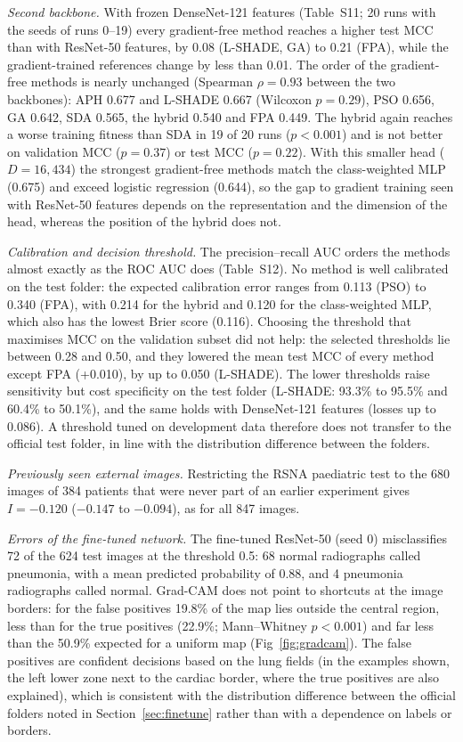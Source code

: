 \documentclass[preprint,12pt]{elsarticle}
\begin{document}
\emph{Second backbone.} With frozen DenseNet-121 features (Table~S11; 20 runs with the seeds of runs 0--19) every gradient-free method reaches a higher test MCC than with ResNet-50 features, by 0.08 (L-SHADE, GA) to 0.21 (FPA), while the gradient-trained references change by less than 0.01. The order of the gradient-free methods is nearly unchanged (Spearman $\rho=0.93$ between the two backbones): APH 0.677 and L-SHADE 0.667 (Wilcoxon $p=0.29$), PSO 0.656, GA 0.642, SDA 0.565, the hybrid 0.540 and FPA 0.449. The hybrid again reaches a worse training fitness than SDA in 19 of 20 runs ($p<0.001$) and is not better on validation MCC ($p=0.37$) or test MCC ($p=0.22$). With this smaller head ($D=16{,}434$) the strongest gradient-free methods match the class-weighted MLP (0.675) and exceed logistic regression (0.644), so the gap to gradient training seen with ResNet-50 features depends on the representation and the dimension of the head, whereas the position of the hybrid does not.


\emph{Calibration and decision threshold.} The precision--recall AUC orders the methods almost exactly as the ROC AUC does (Table~S12). No method is well calibrated on the test folder: the expected calibration error ranges from 0.113 (PSO) to 0.340 (FPA), with 0.214 for the hybrid and 0.120 for the class-weighted MLP, which also has the lowest Brier score (0.116). Choosing the threshold that maximises MCC on the validation subset did not help: the selected thresholds lie between 0.28 and 0.50, and they lowered the mean test MCC of every method except FPA (+0.010), by up to 0.050 (L-SHADE). The lower thresholds raise sensitivity but cost specificity on the test folder (L-SHADE: 93.3\% to 95.5\% and 60.4\% to 50.1\%), and the same holds with DenseNet-121 features (losses up to 0.086). A threshold tuned on development data therefore does not transfer to the official test folder, in line with the distribution difference between the folders.


\emph{Previously seen external images.} Restricting the RSNA paediatric test to the 680 images of 384 patients that were never part of an earlier experiment gives $I=-0.120$ ($-0.147$ to $-0.094$), as for all 847 images.

\emph{Errors of the fine-tuned network.} The fine-tuned ResNet-50 (seed 0) misclassifies 72 of the 624 test images at the threshold 0.5: 68 normal radiographs called pneumonia, with a mean predicted probability of 0.88, and 4 pneumonia radiographs called normal. Grad-CAM does not point to shortcuts at the image borders: for the false positives 19.8\% of the map lies outside the central region, less than for the true positives (22.9\%; Mann--Whitney $p<0.001$) and far less than the 50.9\% expected for a uniform map (Fig~\ref{fig:gradcam}). The false positives are confident decisions based on the lung fields (in the examples shown, the left lower zone next to the cardiac border, where the true positives are also explained), which is consistent with the distribution difference between the official folders noted in Section~\ref{sec:finetune} rather than with a dependence on labels or borders.
\end{document}
